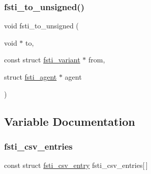 \mbox{\label{fsti-events_8c_a0dea3a294caae9f80119ec53f4116f0f}} 
\subsubsection{\texorpdfstring{fsti\+\_\+to\+\_\+unsigned()}{fsti\_to\_unsigned()}}
{\footnotesize\ttfamily void fsti\+\_\+to\+\_\+unsigned (\begin{DoxyParamCaption}\item[{void $\ast$}]{to,  }\item[{const struct \mbox{\hyperlink{structfsti__variant}{fsti\+\_\+variant}} $\ast$}]{from,  }\item[{struct \mbox{\hyperlink{structfsti__agent}{fsti\+\_\+agent}} $\ast$}]{agent }\end{DoxyParamCaption})}



\subsection{Variable Documentation}
\mbox{\label{fsti-events_8c_a7101c8980d633b64a8060f6f91c48dcd}} 
\subsubsection{\texorpdfstring{fsti\+\_\+csv\+\_\+entries}{fsti\_csv\_entries}}
{\footnotesize\ttfamily const struct \mbox{\hyperlink{structfsti__csv__entry}{fsti\+\_\+csv\+\_\+entry}} fsti\+\_\+csv\+\_\+entries\mbox{[}$\,$\mbox{]}}

